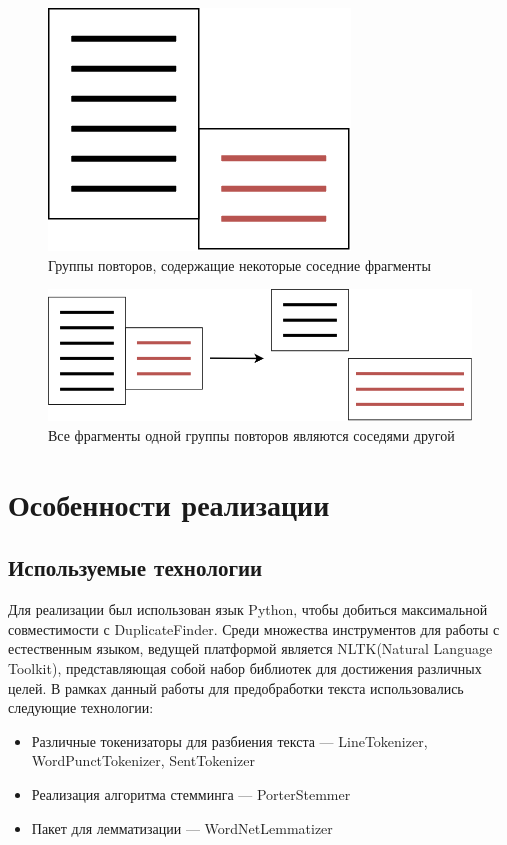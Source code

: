 \documentclass[14pt]{matmex-diploma-custom}
\begin{document}
\begin{figure}[h!]
	\includegraphics[scale=0.5]{pictures/Balance2.png}
	\centering
	\caption{Группы повторов, содержащие некоторые соседние фрагменты}
	\label{fig:Balance2}
\end{figure}

\begin{figure}[h!]
	\includegraphics[scale=0.5]{pictures/Balance3.png}
	\centering
	\caption{Все фрагменты одной группы повторов являются соседями другой}
	\label{fig:Balance3}
\end{figure}

\clearpage
\section{Особенности реализации}

\subsection{Используемые технологии}

Для реализации был использован язык Python, чтобы добиться максимальной совместимости с DuplicateFinder. Среди множества инструментов для работы с естественным языком, ведущей платформой является NLTK(Natural Language Toolkit), представляющая собой набор библиотек для достижения различных целей. В рамках данный работы для предобработки текста использовались следующие технологии:
\begin{itemize}
	\item Различные токенизаторы для разбиения текста --- LineTokenizer, WordPunctTokenizer, SentTokenizer
	\item Реализация алгоритма стемминга --- PorterStemmer
	\item Пакет для лемматизации --- WordNetLemmatizer
\end{itemize}
\end{document}
